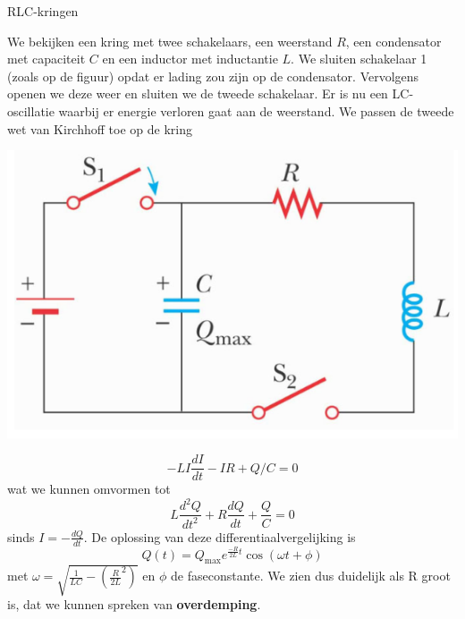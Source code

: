 \begin{app}{RLC-kringen}
    \vspace{-0.5cm}
    \begin{minipage}{.73\textwidth}
        \vspace{0.2cm}
        We bekijken een kring met twee schakelaars, een weerstand $R$, een condensator met capaciteit $C$ en een inductor
        met inductantie $L$. We sluiten schakelaar 1 (zoals op de figuur) opdat er lading zou zijn op de condensator. 
        Vervolgens openen we deze weer en sluiten we de tweede schakelaar. Er is nu een LC-oscillatie waarbij er energie verloren gaat aan de weerstand.
        We passen de tweede wet van Kirchhoff toe op de kring
    \end{minipage}
    \begin{minipage}{.23\textwidth}
        \vspace{0.3cm}\includegraphics[scale = 0.45]{Images/Magnetisme/RLCKring}
    \end{minipage}
    \vspace{-0.25cm}
    \begin{equation*}
        - LI\frac{dI}{dt} - IR + Q/C = 0
    \end{equation*}
    wat we kunnen omvormen tot
    \begin{equation*}
        L\frac{d^2Q}{dt^2} + R\dfrac{dQ}{dt} + \dfrac{Q}{C} = 0
    \end{equation*}
    sinds $I = -\frac{dQ}{dt}$. De oplossing van deze differentiaalvergelijking is
    \begin{equation*}
        Q(t) = Q_{\max}e^{\frac{-R}{2L}t}\cos(\omega t + \phi)
    \end{equation*}
    met $\omega = \sqrt{\frac{1}{LC} - \left(\frac{R}{2L}^2\right)}$ en $\phi$ de faseconstante. We zien dus duidelijk als R groot is,
    dat we kunnen spreken van \textbf{overdemping}.
\end{app}

